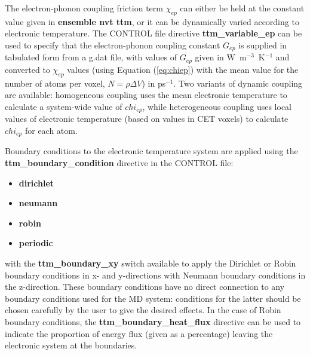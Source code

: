 The electron-phonon coupling
friction term $\chi_{ep}$ can either be held at
the constant value given in {\bf ensemble nvt ttm}, or it can be dynamically
varied according to electronic temperature. The CONTROL file directive
{\bf ttm\_variable\_ep} can be used to specify that the electron-phonon coupling
constant $G_{ep}$ is supplied in tabulated form from a g.dat file, with
values of $G_{ep}$ given in W~m$^{-3}$~K$^{-1}$ and converted to
$\chi_{ep}$ values (using Equation (\ref{eq:chiep}) with the mean value for
the number of atoms per voxel, $N = \rho \Delta V$) in ps$^{-1}$. Two
variants of dynamic coupling are available: homogeneous coupling
uses the mean electronic temperature to calculate a system-wide value
of $chi_{ep}$, while heterogeneous coupling uses local values of
electronic temperature (based on values in CET voxels) to calculate
$chi_{ep}$ for each atom.

Boundary conditions
to the electronic temperature system are applied
using the {\bf ttm\_boundary\_condition} directive in the CONTROL file: 
\begin{itemize}
\item {\bf dirichlet}
\item {\bf neumann}
\item {\bf robin}
\item {\bf periodic}
\end{itemize}
with the {\bf ttm\_boundary\_xy} switch available to apply the Dirichlet or
Robin boundary conditions in x- and y-directions with Neumann boundary
conditions in the z-direction. These boundary conditions have no direct 
connection to any boundary conditions used for the MD system: conditions 
for the latter should be chosen carefully by the user to give the desired effects.
In the case of Robin boundary conditions, the {\bf ttm\_boundary\_heat\_flux}
directive can be used to indicate the proportion of energy flux (given as a
percentage) leaving the electronic system at the boundaries.

